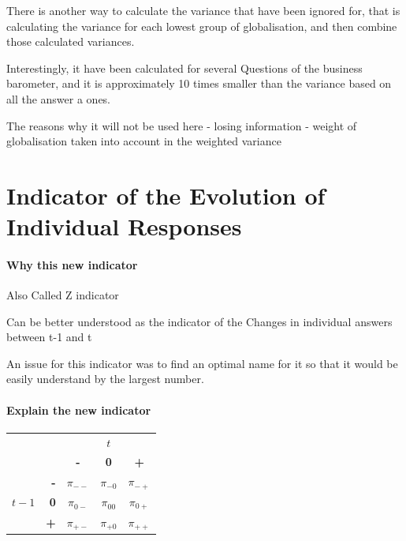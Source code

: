 \documentclass[12pt,a4paper,oneside]{book}
\begin{document}
There is another way to calculate the variance that have been ignored for, that is calculating the variance for each lowest group of globalisation, and then combine those calculated variances.


Interestingly, it have been calculated for several Questions of the business barometer, and it is approximately 10 times smaller than the variance based on all the answer a ones.



The reasons why it will not be used here
- losing information
- weight of globalisation taken into account in the weighted variance




\chapter{Indicator of the Evolution of Individual Responses}

 \subsubsection{Why this new indicator}

Also Called Z indicator

Can be better understood as the indicator of the Changes in individual answers between t-1 and t



 An issue for this indicator was to find an optimal name for it so that it would be easily understand by the largest number. \\

\subsubsection{Explain the new indicator}

\begin{center}
\begin{tabular}{r | r | c c c | }
\multicolumn{1}{r}{} & \multicolumn{1}{r}{} &	\multicolumn{3}{c}{$t$} \\ \cline{3-5}
\multicolumn{1}{r}{} & 		& \textbf{-} & \textbf{0} & \textbf{+} \\ \cline{2-5}
		&    \textbf{-} & $\pi_{--}$	& $\pi_{-0}$	& $\pi_{-+}$ \\ 
$t-1$ & \textbf{0} & $\pi_{0-}$	& $\pi_{00}$	& $\pi_{0+}$	\\
		&    \textbf{+} & $\pi_{+-}$	& $\pi_{+0}$	& $\pi_{++}$ \\ \cline{2-5}
\end{tabular}    
\end{center}
\end{document}
